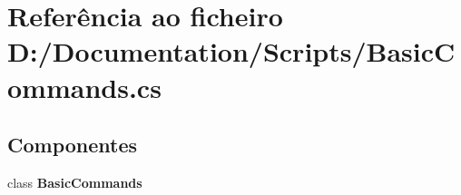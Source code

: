 \section{Referência ao ficheiro D\+:/\+Documentation/\+Scripts/\+Basic\+Commands.cs}
\label{_basic_commands_8cs}
\subsection*{Componentes}
\begin{DoxyCompactItemize}
\item 
class \textbf{ Basic\+Commands}
\end{DoxyCompactItemize}
